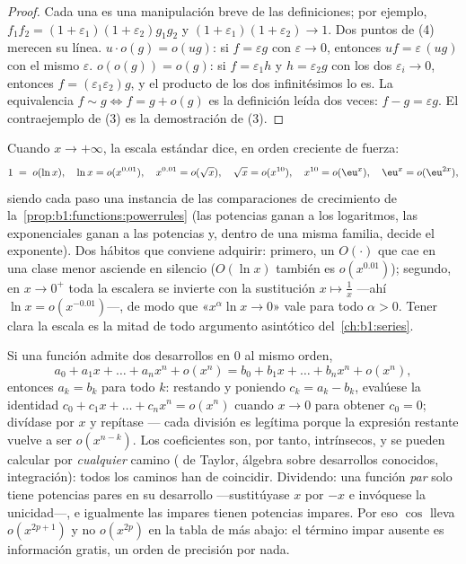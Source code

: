 \begin{proof}
Cada una es una manipulación breve de las definiciones; por ejemplo,
$f_1 f_2 = (1+\varepsilon_1)(1+\varepsilon_2) g_1 g_2$ y
$(1 + \varepsilon_1)(1+\varepsilon_2) \to 1$. Dos puntos de (4)
merecen su línea. $u\cdot o(g) = o(ug)$: si $f = \varepsilon g$ con
$\varepsilon \to 0$, entonces $uf = \varepsilon\,(ug)$ con el mismo
$\varepsilon$. $o(o(g)) = o(g)$: si $f = \varepsilon_1 h$ y
$h = \varepsilon_2 g$ con los dos $\varepsilon_i \to 0$, entonces
$f = (\varepsilon_1\varepsilon_2) g$, y el producto de los dos
infinitésimos lo es. La equivalencia $f \sim g \iff f = g + o(g)$ es
la definición leída dos veces: $f - g = \varepsilon g$. El
contraejemplo de (3) es la demostración de (3).
\end{proof}

\begin{example}\label{ex:b1:taylor:scale}
Cuando $x \to +\infty$, la escala estándar dice, en orden creciente
de fuerza:
\[
1 \;=\; o(\ln x), \quad
\ln x = o(x^{0.01}), \quad
x^{0.01} = o(\sqrt x), \quad
\sqrt x = o(x^{10}), \quad
x^{10} = o(\eu^{x}), \quad
\eu^x = o(\eu^{2x}) ,
\]
siendo cada paso una instancia de las comparaciones de crecimiento
de la~\cref{prop:b1:functions:powerrules} (las potencias ganan a los
logaritmos, las exponenciales ganan a las potencias y, dentro de una
misma familia, decide el exponente). Dos hábitos que conviene
adquirir: primero, un $O(\cdot)$ que cae en una clase menor asciende
en silencio ($O(\ln x)$ también es $o(x^{0.01})$); segundo, en
$x \to 0^+$ toda la escalera se invierte con la sustitución
$x \mapsto \frac1x$ ---ahí $\ln x = o(x^{-0.01})$---, de modo que
«$x^\alpha \ln x \to 0$» vale para todo $\alpha > 0$. Tener clara la
escala es la mitad de todo argumento asintótico
del~\cref{ch:b1:series}.
\end{example}

\begin{example}\label{ex:b1:taylor:uniqueness}
Si una función admite dos desarrollos en $0$ al mismo orden,
\[
a_0 + a_1 x + \dots + a_n x^n + o(x^n)
= b_0 + b_1 x + \dots + b_n x^n + o(x^n),
\]
entonces $a_k = b_k$ para todo $k$: restando y poniendo
$c_k = a_k - b_k$, evalúese la identidad
$c_0 + c_1 x + \dots + c_n x^n = o(x^n)$ cuando $x \to 0$ para
obtener $c_0 = 0$; divídase por $x$ y repítase --- cada división es
legítima porque la expresión restante vuelve a ser $o(x^{n-k})$. Los
coeficientes son, por tanto, intrínsecos, y se pueden calcular por
\emph{cualquier} camino ( de Taylor, álgebra sobre
desarrollos conocidos, integración): todos los caminos han de
coincidir. Dividendo: una función \emph{par} solo tiene potencias
pares en su desarrollo ---sustitúyase $x$ por $-x$ e invóquese la
unicidad---, e igualmente las impares tienen potencias impares. Por
eso $\cos$ lleva $o(x^{2p+1})$ y no $o(x^{2p})$ en la tabla de más
abajo: el término impar ausente es información gratis, un orden de
precisión por nada.
\end{example}


